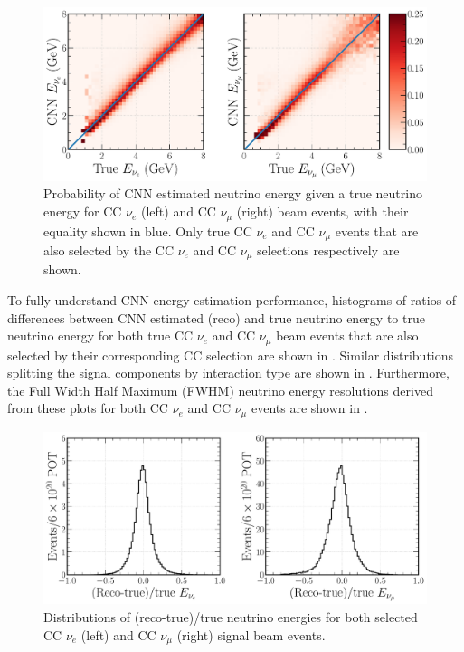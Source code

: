 \begin{figure} %
    \includegraphics[width=\textwidth]{diagrams/7-results/final_energy_2d.pdf}
    \caption[Probability of CNN estimated neutrino energy given a true neutrino energy]
    {Probability of CNN estimated neutrino energy given a true neutrino energy for CC $\nu_{e}$
        (left) and CC $\nu_{\mu}$ (right) beam events, with their equality shown in blue. Only
        true CC $\nu_{e}$ and CC $\nu_{\mu}$ events that are also selected by the CC $\nu_{e}$ and
        CC $\nu_{\mu}$ selections respectively are shown.}
    \label{fig:final_energy_2d}
\end{figure}

To fully understand CNN energy estimation performance, histograms of ratios of differences between
CNN estimated (reco) and true neutrino energy to true neutrino energy for both true CC $\nu_{e}$
and CC $\nu_{\mu}$ beam events that are also selected by their corresponding CC selection are
shown in . Similar distributions splitting the signal components
by interaction type are shown in . Furthermore, the Full
Width Half Maximum (FWHM) neutrino energy resolutions derived from these plots for both CC
$\nu_{e}$ and CC $\nu_{\mu}$ events are shown in .

\begin{figure} %
    \includegraphics[width=\textwidth]{diagrams/7-results/final_energy_frac.pdf}
    \caption[Distributions of (reco-true)/true neutrino energies]
    {Distributions of (reco-true)/true neutrino energies for both selected CC $\nu_{e}$ (left) and
        CC $\nu_{\mu}$ (right) signal beam events.}
    \label{fig:final_energy_frac}
\end{figure}

